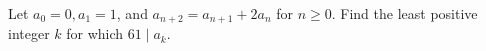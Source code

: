 Let $a_0=0,a_1=1$, and $a_{n+2}=a_{n+1}+2a_n$ for $n\ge0$. Find the least positive integer $k$ for which $61\mid a_k$.
